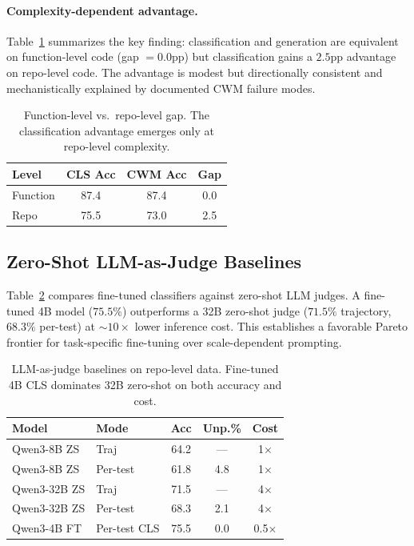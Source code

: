 \documentclass[11pt,a4paper]{article}
\begin{document}
\paragraph{Complexity-dependent advantage.} Table~\ref{tab:complexity} summarizes the key finding: classification and generation are equivalent on function-level code (gap $= 0.0$pp) but classification gains a $2.5$pp advantage on repo-level code. The advantage is modest but directionally consistent and mechanistically explained by documented CWM failure modes.

\begin{table}[t]
\centering
\small
\caption{Function-level vs.\ repo-level gap. The classification advantage emerges only at repo-level complexity.}
\label{tab:complexity}
\begin{tabular}{lccc}
\toprule
\textbf{Level} & \textbf{CLS Acc} & \textbf{CWM Acc} & \textbf{Gap} \\
\midrule
Function & 87.4 & 87.4 & 0.0 \\
Repo & 75.5 & 73.0 & 2.5 \\
\bottomrule
\end{tabular}
\end{table}

\subsection{Zero-Shot LLM-as-Judge Baselines}

Table~\ref{tab:judge} compares fine-tuned classifiers against zero-shot LLM judges. A fine-tuned 4B model ($75.5\%$) outperforms a 32B zero-shot judge ($71.5\%$ trajectory, $68.3\%$ per-test) at ${\sim}10{\times}$ lower inference cost. This establishes a favorable Pareto frontier for task-specific fine-tuning over scale-dependent prompting.

\begin{table}[t]
\centering
\small
\caption{LLM-as-judge baselines on repo-level data. Fine-tuned 4B CLS dominates 32B zero-shot on both accuracy and cost.}
\label{tab:judge}
\begin{tabular}{llccc}
\toprule
\textbf{Model} & \textbf{Mode} & \textbf{Acc} & \textbf{Unp.\%} & \textbf{Cost} \\
\midrule
Qwen3-8B ZS & Traj & 64.2 & --- & 1$\times$ \\
Qwen3-8B ZS & Per-test & 61.8 & 4.8 & 1$\times$ \\
Qwen3-32B ZS & Traj & 71.5 & --- & 4$\times$ \\
Qwen3-32B ZS & Per-test & 68.3 & 2.1 & 4$\times$ \\
Qwen3-4B FT & Per-test CLS & 75.5 & 0.0 & 0.5$\times$ \\
\bottomrule
\end{tabular}
\end{table}
\end{document}

